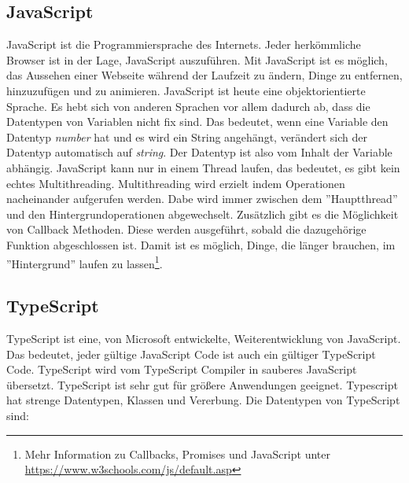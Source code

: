 \subsection{JavaScript}
\label{sec:vor-js}
JavaScript ist die Programmiersprache des Internets. Jeder herkömmliche Browser ist in der Lage, JavaScript auszuführen. Mit JavaScript ist es möglich, das Aussehen einer Webseite während der Laufzeit zu ändern, Dinge zu entfernen, hinzuzufügen und zu animieren. JavaScript ist heute eine objektorientierte Sprache. Es hebt sich von anderen Sprachen vor allem dadurch ab, dass die Datentypen von Variablen nicht fix sind. Das bedeutet, wenn eine Variable den Datentyp \textit{number} hat und es wird ein String angehängt, verändert sich der Datentyp automatisch auf \textit{string}. Der Datentyp ist also vom Inhalt der Variable abhängig. JavaScript kann nur in einem Thread laufen, das bedeutet, es gibt kein echtes Multithreading. Multithreading wird erzielt indem Operationen nacheinander aufgerufen werden. Dabe wird immer zwischen dem ''Hauptthread'' und den Hintergrundoperationen abgewechselt. Zusätzlich gibt es die Möglichkeit von Callback Methoden. Diese werden ausgeführt, sobald die dazugehörige Funktion abgeschlossen ist. Damit ist es möglich, Dinge, die länger brauchen, im ''Hintergrund'' laufen zu lassen\footnote{Mehr Information zu Callbacks, Promises und JavaScript unter \url{https://www.w3schools.com/js/default.asp}}.

\subsection{TypeScript}
\label{sec:vor-ts}
TypeScript ist eine, von Microsoft entwickelte, Weiterentwicklung von JavaScript. Das bedeutet, jeder gültige JavaScript Code ist auch ein gültiger TypeScript Code. TypeScript wird vom TypeScript Compiler in sauberes JavaScript übersetzt. TypeScript ist sehr gut für größere Anwendungen geeignet. Typescript hat strenge Datentypen, Klassen und Vererbung. Die Datentypen von TypeScript sind:

